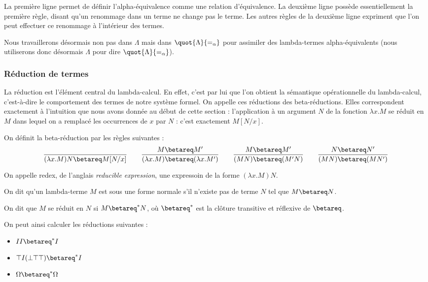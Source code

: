 \begin{rmk}
    La première ligne permet de définir l'alpha-équivalence comme une relation d'équivalence. La deuxième ligne possède essentiellement la première règle, disant qu'un renommage dans un terme ne change pas le terme. Les autres règles de la deuxième ligne expriment que l'on peut effectuer ce renommage \og à l'intérieur\fg{} des termes.
\end{rmk}

Nous travaillerons désormais non pas dans $\Lambda$ mais dans $\quot{\Lambda}{=_\alpha}$ pour assimiler des lambda-termes alpha-équivalents (nous utiliserons donc désormais $\Lambda$ pour dire $\quot{\Lambda}{=_\alpha}$).

\subsubsection{Réduction de termes}

La réduction est l'élément central du lambda-calcul. En effet, c'est par lui que l'on obtient la sémantique opérationnelle du lambda-calcul, c'est-à-dire le comportement des termes de notre système formel. On appelle ces réductions des beta-réductions. Elles correspondent exactement à l'intuition que nous avons donnée au début de cette section : l'application à un argument $N$ de la fonction $\lambda x. M$ se réduit en $M$ dans lequel on a remplacé les occurrences de $x$ par $N$ : c'est exactement $M[N/x]$.

\begin{defi}
    On définit la beta-réduction par les règles suivantes :
    $$\dfrac{}{(\lambda x.M) N \betareq M[N/x]}\qquad \dfrac{M \betareq M'}{(\lambda x.M)\betareq(\lambda x.M')}\qquad\dfrac{M \betareq M'}{(M N) \betareq (M' N)}\qquad \dfrac{N \betareq N'}{(M N)\betareq (M N')}$$
    
    On appelle redex, de l'anglais \textit{reducible expression}, une expressoin de la forme $(\lambda x. M) N$.
    
    On dit qu'un lambda-terme $M$ est sous une forme normale s'il n'existe pas de terme $N$ tel que $M\betareq N$.
    
    On dit que $M$ se réduit en $N$ si $M\betareq^* N$, où $\betareq^*$ est la clôture transitive et réflexive de $\betareq$.
\end{defi}

\begin{exo}
    On peut ainsi calculer les réductions suivantes :
    \begin{itemize}[label=$\bullet$]
        \item $I I \betareq^* I$
        \item $\top I (\bot \top \top) \betareq^* I$
        \item $\Omega \betareq^* \Omega$
    \end{itemize}
\end{exo}

